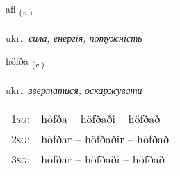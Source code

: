 \documentclass[frontgrid, backgrid]{flacards}\usepackage[]{graphicx}\usepackage[]{xcolor}
\begin{document}
\renewcommand{\flhead}{\vskip5pt \fboxsep=0pt {\small\bfseries\footnotesize Nafnorð | іменник}}
\renewcommand{\fcfoot}{\vskip5pt \fboxsep=0pt \hspace{2pt}{\small\bfseries\footnotesize 2K}}

\renewcommand{\blhead}{\vskip5pt {\small\bfseries\footnotesize Nafnorð | іменник }}
\renewcommand{\bcfoot}{\vskip5pt \hspace{2pt}{\small\bfseries\footnotesize 2K}}


{afl \small{\textsubscript{(\textit{n.})}} \\[1ex] %
\textphonetic{[apl̥]} \\
ukr.: \emph{сила; енергія; потужність} \\  [2ex]
\renewcommand*{\arraystretch}{0.8}
}

\renewcommand{\flhead}{\vskip5pt \fboxsep=0pt {\small\bfseries\footnotesize Sagnorð | дієслово}}
\renewcommand{\fcfoot}{\vskip5pt \fboxsep=0pt \hspace{2pt}{\small\bfseries\footnotesize 2K}}

\renewcommand{\blhead}{\vskip5pt {\small\bfseries\footnotesize Sagnorð | дієслово }}
\renewcommand{\bcfoot}{\vskip5pt \hspace{2pt}{\small\bfseries\footnotesize 2K}}


{höfða \small{\textsubscript{(\textit{v.})}} \\[1ex] %
\textphonetic{[hœvða]} \\
ukr.: \emph{звертатися; оскаржувати} \\  [2ex]
\renewcommand*{\arraystretch}{0.8}
\begin{tabular}{p{1cm}l}
\textsc{1sg}: & höfða -- höfðaði -- höfðað \\ 
\textsc{2sg}: & höfðar -- höfðaðir -- höfðað \\ 
\textsc{3sg}: & höfðar -- höfðaði -- höfðað \\ 
\end{tabular}
}
\end{document}

